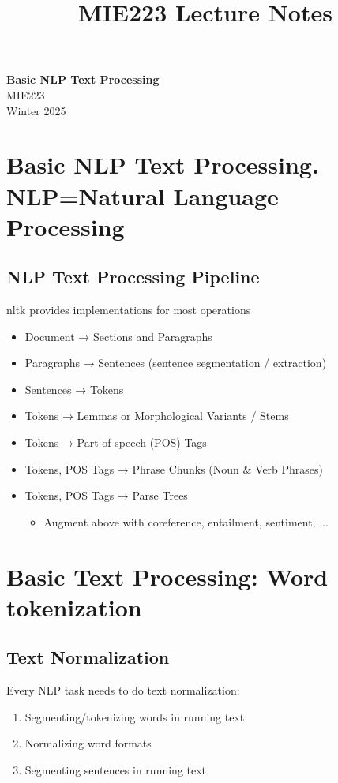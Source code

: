 \documentclass[11pt]{article}
\theoremstyle{definition}
\begin{document}
\setcounter{section}{0}
\title{MIE223 Lecture Notes}

\thispagestyle{empty}

\begin{center}
{\LARGE \bf Basic NLP Text Processing}\\
{\large MIE223}\\
Winter 2025
\end{center}
\section{Basic NLP Text Processing.
 NLP=Natural Language Processing}
\subsection{NLP Text Processing Pipeline}
nltk provides
implementations
for most operations

\begin{itemize}
  \item Document → Sections and Paragraphs
  \item Paragraphs → Sentences (sentence segmentation / extraction)
  \item Sentences → Tokens
  \item Tokens → Lemmas or Morphological Variants / Stems
  \item Tokens → Part-of-speech (POS) Tags
  \item Tokens, POS Tags → Phrase Chunks (Noun \& Verb Phrases)
  \item Tokens, POS Tags → Parse Trees
  \begin{itemize}
    \item Augment above with coreference, entailment, sentiment, ...
  \end{itemize}
\end{itemize}

\section{Basic Text
Processing: Word tokenization}
\subsection{Text Normalization}
Every NLP task needs to do text
normalization:
\begin{enumerate}
  \item Segmenting/tokenizing words in running text
  \item Normalizing word formats
  \item Segmenting sentences in running text
\end{enumerate}
\end{document}
